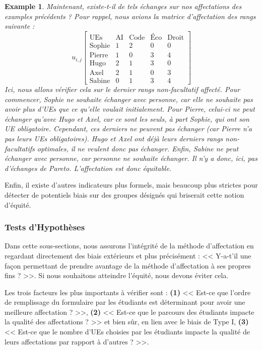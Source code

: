 \documentclass{rapport}
\theoremstyle{definition}
\theoremstyle{remark}
\theoremstyle{plain}
\newtheorem{example}{Example}
\theoremstyle{definition}
\theoremstyle{remark}
\begin{document}
\begin{example}\label{ex:running6}
    Maintenant, existe-t-il de tels échanges sur nos affectations des examples précédents ? Pour rappel, nous avions la matrice d'affectation des rangs suivante :
    $$
        u_{i,j}\begin{bmatrix}
            \text{UEs} & \text{AI} & \text{Code} & \text{Éco} & \text{Droit}\\
            \text{Sophie} & 1 & 2 & 0 & 0\\
            \text{Pierre} & 1 & 0 & 3 & 4\\
            \text{Hugo} & 2 & 1 & 3 & 0\\
            \text{Axel} & 2 & 1 & 0 & 3\\
            \text{Sabine} & 0 & 1 & 3 & 4
        \end{bmatrix}
    $$
    Ici, nous allons vérifier cela sur le dernier rangs non-facultatif affecté. Pour commencer, Sophie ne souhaite échanger avec personne, car elle ne souhaite pas avoir plus d'UEs que ce qu'elle voulait initialement. Pour Pierre, celui-ci ne peut échanger qu'avec Hugo et Axel, car ce sont les seuls, à part Sophie, qui ont son UE obligatoire. Cependant, ces derniers ne peuvent pas échanger (car Pierre n'a pas leurs UEs obligatoires). 
    Hugo et Axel ont déjà leurs derniers rangs non-facultatifs optimales, il ne veulent donc pas échanger. Enfin, Sabine ne peut échanger avec personne, car personne ne souhaite échanger. 
    Il n'y a donc, ici, pas d'échanges de Pareto. L'affectation est donc équitable.
\end{example}

Enfin, il existe d'autres indicateurs plus formels, mais beaucoup plus strictes pour détecter de potentiels biais sur des groupes désignés qui briserait cette notion d'équité.

\subsubsection{Tests d'Hypothèses}
Dans cette sous-sections, nous assurons l'intégrité de la méthode d'affectation en regardant directement des biais extérieurs et plus précisément : << Y-a-t'il une façon permettant de prendre avantage de la méthode d'affectation à ses propres fins ? >>.
Si nous souhaitons atteindre l'équité, nous devons éviter cela.

Les trois facteurs les plus importants à vérifier sont : \textbf{(1)} << Est-ce que l'ordre de remplissage du formulaire par les étudiants est déterminant pour avoir une meilleure affectation ? >>,
\textbf{(2)} << Est-ce que le parcours des étudiants impacte la qualité des affectations ? >> et bien sûr, en lien avec le biais de Type I, 
\textbf{(3)} << Est-ce que le nombre d'UEs choisies par les étudiants impacte la qualité de leurs affectations par rapport à d'autres ? >>.
\end{document}
